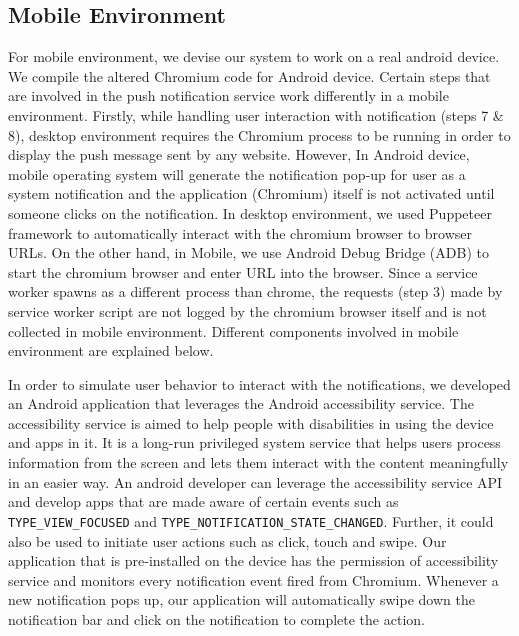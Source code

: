 \subsection{Mobile Environment}
For mobile environment, we devise our system to work on a real android device. We compile the altered Chromium code for Android device. Certain steps that are involved in the push notification service work differently in a mobile environment. Firstly, while handling user interaction with notification (steps 7 \& 8), desktop environment requires the Chromium process to be running in order to display the push message sent by any website. However, In Android device, mobile operating system will generate the notification pop-up for user as a system notification and the application (Chromium) itself is not activated until someone clicks on the notification. In desktop environment, we used Puppeteer framework to automatically interact with the chromium browser to browser URLs. On the other hand, in Mobile, we use Android Debug Bridge (ADB) to start the chromium browser and enter URL into the browser. Since a service worker spawns as a different process than chrome, the requests (step 3) made by service worker script are not logged by the chromium browser itself and is not collected in mobile environment. Different components involved in mobile environment are explained below. 

\textbf{}
In order to simulate user behavior to interact with the notifications, we developed an Android application that leverages the Android accessibility service. The accessibility service is aimed to help people with disabilities in using the device and apps in it. It is a long-run privileged system service that helps users process information from the screen and lets them interact with the content meaningfully in an easier way. An android developer can leverage the accessibility service API and develop apps that are made aware of certain events such as \texttt{TYPE\_VIEW\_FOCUSED} and \texttt{TYPE\_NOTIFICATION\_STATE\_CHANGED}. Further, it could also be used to initiate user actions such as click, touch and swipe. Our application that is pre-installed on the device has the permission of accessibility service and monitors every notification event fired from Chromium. Whenever a new notification pops up, our application will automatically swipe down the notification bar and click on the notification to complete the action. 

